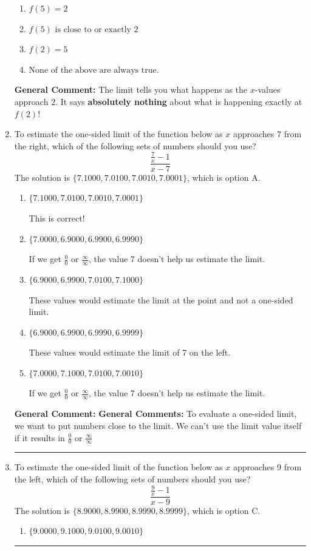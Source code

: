 \documentclass{extbook}[14pt]
\newcommand{\litem}[1]{\item #1

\rule{\textwidth}{0.4pt}}
\begin{document}
\begin{enumerate}
{\begin{enumerate}[label=\Alph*.]
\item \( f(5) = 2 \)


\item \( f(5) \text{ is close to or exactly } 2 \)


\item \( f(2) = 5 \)


\item \( \text{None of the above are always true.} \)


\end{enumerate}

\textbf{General Comment:} The limit tells you what happens as the $x$-values approach $2$. It says \textbf{absolutely nothing} about what is happening exactly at $f(2)$!
}
\litem{
To estimate the one-sided limit of the function below as $x$ approaches 7 from the right, which of the following sets of numbers should you use?
\[ \frac{\frac{7}{x} - 1}{x - 7} \]The solution is \( \{ 7.1000, 7.0100, 7.0010, 7.0001 \} \), which is option A.\begin{enumerate}[label=\Alph*.]
\item \( \{ 7.1000, 7.0100, 7.0010, 7.0001 \} \)

This is correct!
\item \( \{ 7.0000, 6.9000, 6.9900, 6.9990 \} \)

If we get $\frac{0}{0}$ or $\frac{\infty}{\infty}$, the value 7 doesn't help us estimate the limit.
\item \( \{ 6.9000, 6.9900, 7.0100, 7.1000 \} \)

These values would estimate the limit at the point and not a one-sided limit.
\item \( \{ 6.9000, 6.9900, 6.9990, 6.9999 \} \)

These values would estimate the limit of 7 on the left.
\item \( \{ 7.0000, 7.1000, 7.0100, 7.0010 \} \)

If we get $\frac{0}{0}$ or $\frac{\infty}{\infty}$, the value 7 doesn't help us estimate the limit.
\end{enumerate}

\textbf{General Comment:} \textbf{General Comments:} To evaluate a one-sided limit, we want to put numbers close to the limit. We can't use the limit value itself if it results in $\frac{0}{0}$ or $\frac{\infty}{\infty}$
}
\litem{
To estimate the one-sided limit of the function below as $x$ approaches 9 from the left, which of the following sets of numbers should you use?
\[ \frac{\frac{9}{x} - 1}{x - 9} \]The solution is \( \{ 8.9000, 8.9900, 8.9990, 8.9999 \} \), which is option C.\begin{enumerate}[label=\Alph*.]
\item \( \{ 9.0000, 9.1000, 9.0100, 9.0010 \} \)


\end{enumerate}}
\end{enumerate}
\end{document}
